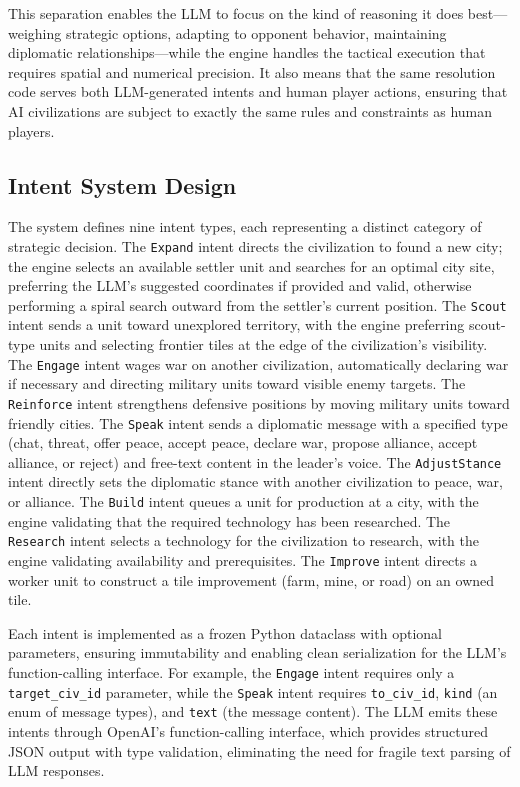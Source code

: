 \documentclass[conference]{IEEEtran}
\begin{document}
This separation enables the LLM to focus on the kind of reasoning it does best---weighing strategic options, adapting to opponent behavior, maintaining diplomatic relationships---while the engine handles the tactical execution that requires spatial and numerical precision. It also means that the same resolution code serves both LLM-generated intents and human player actions, ensuring that AI civilizations are subject to exactly the same rules and constraints as human players.

\subsection{Intent System Design}

The system defines nine intent types, each representing a distinct category of strategic decision. The \texttt{Expand} intent directs the civilization to found a new city; the engine selects an available settler unit and searches for an optimal city site, preferring the LLM's suggested coordinates if provided and valid, otherwise performing a spiral search outward from the settler's current position. The \texttt{Scout} intent sends a unit toward unexplored territory, with the engine preferring scout-type units and selecting frontier tiles at the edge of the civilization's visibility. The \texttt{Engage} intent wages war on another civilization, automatically declaring war if necessary and directing military units toward visible enemy targets. The \texttt{Reinforce} intent strengthens defensive positions by moving military units toward friendly cities. The \texttt{Speak} intent sends a diplomatic message with a specified type (chat, threat, offer peace, accept peace, declare war, propose alliance, accept alliance, or reject) and free-text content in the leader's voice. The \texttt{AdjustStance} intent directly sets the diplomatic stance with another civilization to peace, war, or alliance. The \texttt{Build} intent queues a unit for production at a city, with the engine validating that the required technology has been researched. The \texttt{Research} intent selects a technology for the civilization to research, with the engine validating availability and prerequisites. The \texttt{Improve} intent directs a worker unit to construct a tile improvement (farm, mine, or road) on an owned tile.

Each intent is implemented as a frozen Python dataclass with optional parameters, ensuring immutability and enabling clean serialization for the LLM's function-calling interface. For example, the \texttt{Engage} intent requires only a \texttt{target\_civ\_id} parameter, while the \texttt{Speak} intent requires \texttt{to\_civ\_id}, \texttt{kind} (an enum of message types), and \texttt{text} (the message content). The LLM emits these intents through OpenAI's function-calling interface, which provides structured JSON output with type validation, eliminating the need for fragile text parsing of LLM responses.
\end{document}
